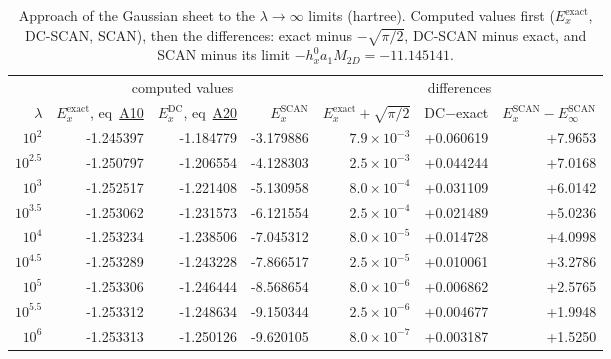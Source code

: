 \documentclass[journal=jctcce,manuscript=suppinfo]{achemso}
\begin{document}
\begin{table}[H]
\centering
\caption{Approach of the Gaussian sheet to the $\lambda\to\infty$ limits
  (hartree).  Computed values first ($E_x^{\mathrm{exact}}$, DC-SCAN, SCAN), then
  the differences: exact minus $-\sqrt{\pi/2}$, DC-SCAN minus exact, and SCAN
  minus its limit $-h_x^0a_1M_{2D}=-11.145141$.}
\label{tab:dcscan-sheet-asym}
\scriptsize
\begin{tabular}{@{}r|rrr|rrr@{}}
\toprule
 & \multicolumn{3}{c|}{computed values} & \multicolumn{3}{c}{differences} \\
$\lambda$ & $E_x^{\mathrm{exact}}$, eq~\href{main.pdf\#equation.10}{A10} & $E_x^{\mathrm{DC}}$, eq~\href{main.pdf\#equation.20}{A20} & $E_x^{\mathrm{SCAN}}$ & $E_x^{\mathrm{exact}}+\sqrt{\pi/2}$ & DC$-$exact & $E_x^{\mathrm{SCAN}}-E_\infty^{\mathrm{SCAN}}$ \\
\midrule
$10^{2}$ & -1.245397 & -1.184779 & -3.179886 & $7.9\times10^{-3}$ & +0.060619 & +7.9653 \\
$10^{2.5}$ & -1.250797 & -1.206554 & -4.128303 & $2.5\times10^{-3}$ & +0.044244 & +7.0168 \\
$10^{3}$ & -1.252517 & -1.221408 & -5.130958 & $8.0\times10^{-4}$ & +0.031109 & +6.0142 \\
$10^{3.5}$ & -1.253062 & -1.231573 & -6.121554 & $2.5\times10^{-4}$ & +0.021489 & +5.0236 \\
$10^{4}$ & -1.253234 & -1.238506 & -7.045312 & $8.0\times10^{-5}$ & +0.014728 & +4.0998 \\
$10^{4.5}$ & -1.253289 & -1.243228 & -7.866517 & $2.5\times10^{-5}$ & +0.010061 & +3.2786 \\
$10^{5}$ & -1.253306 & -1.246444 & -8.568654 & $8.0\times10^{-6}$ & +0.006862 & +2.5765 \\
$10^{5.5}$ & -1.253312 & -1.248634 & -9.150344 & $2.5\times10^{-6}$ & +0.004677 & +1.9948 \\
$10^{6}$ & -1.253313 & -1.250126 & -9.620105 & $8.0\times10^{-7}$ & +0.003187 & +1.5250 \\

\bottomrule
\end{tabular}
\end{table}
\end{document}
